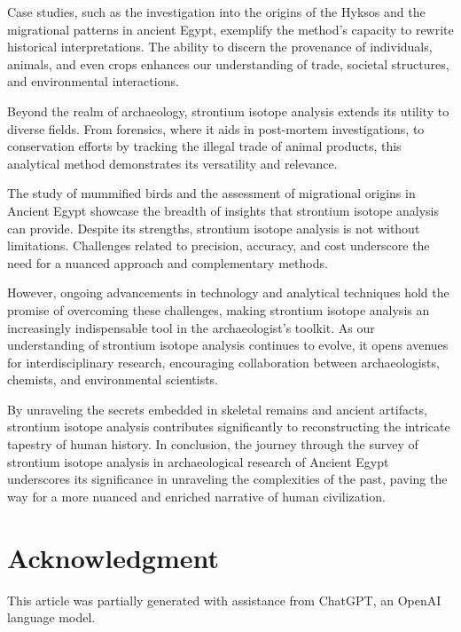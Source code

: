 \documentclass[a4paper, 12pt]{article}
\begin{document}
Case studies, such as the investigation into the origins of the Hyksos and the
migrational patterns in ancient Egypt, exemplify the method's capacity to
rewrite historical interpretations. The ability to discern the provenance of
individuals, animals, and even crops enhances our understanding of trade,
societal structures, and environmental interactions.

Beyond the realm of archaeology, strontium isotope analysis extends its utility
to diverse fields. From forensics, where it aids in post-mortem investigations,
to conservation efforts by tracking the illegal trade of animal products, this
analytical method demonstrates its versatility and relevance.

The study of mummified birds and the assessment of migrational origins in
Ancient Egypt showcase the breadth of insights that strontium isotope analysis
can provide. Despite its strengths, strontium isotope analysis is not without
limitations. Challenges related to precision, accuracy, and cost underscore the
need for a nuanced approach and complementary methods.

However, ongoing advancements in technology and analytical techniques hold the
promise of overcoming these challenges, making strontium isotope analysis an
increasingly indispensable tool in the archaeologist's toolkit. As our
understanding of strontium isotope analysis continues to evolve, it opens
avenues for interdisciplinary research, encouraging collaboration between
archaeologists, chemists, and environmental scientists.

By unraveling the secrets embedded in skeletal remains and ancient artifacts,
strontium isotope analysis contributes significantly to reconstructing the
intricate tapestry of human history. In conclusion, the journey through the
survey of strontium isotope analysis in archaeological research of Ancient Egypt
underscores its significance in unraveling the complexities of the past,
paving the way for a more nuanced and enriched narrative of human civilization.

\section{Acknowledgment}

This article was partially generated with assistance from ChatGPT, an OpenAI language model.



\end{document}
